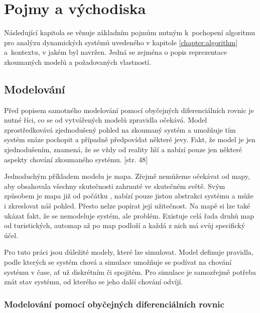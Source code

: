 \chapter{Pojmy a východiska}

Následující kapitola se věnuje základním pojmům nutným k~pochopení
algoritmu pro analýzu dynamických systémů uvedeného v kapitole \ref{chapter:algorithm}
a~kontextu, v jakém byl navržen. Jedná se zejména o popis reprezentace zkou\-ma\-ných
modelů a požadovaných vlastností.


\section{Modelování}

Před popisem samotného modelování pomocí obyčejných diferenciálních rovnic je
nutné říci, co se od vytvářených modelů zpravidla očekává. Model zpro\-středko\-vá\-vá
zjednodušený pohled na zkoumaný systém a umožňuje tím systém snáze pochopit a
případně předpovídat některé jevy. Fakt, že model je jen zjednodušením, znamená,
že se vždy od reality liší a nabízí pouze jen některé aspekty chování zkoumaného
systému. [str. 48]


Jednoduchým příkladem modelu je mapa. Zřejmě nemůžeme očekávat od mapy, aby obsahovala
všechny skutečnosti zahrnuté ve skutečném světě. Svým způsobem je mapa již od počátku
, nabízí pouze jistou abstrakci systému a může i zkreslovat náš pohled.
Přesto nelze popírat její užitečnost. Na mapě si lze také ukázat fakt, že se
nemodeluje systém, ale problém. Existuje celá řada druhů map od turistických, automap
až po map podloží a každá z nich má svůj specifický účel. \cite[str. 47 -- 58]{pelanek2012}

Pro tuto práci jsou důležité modely, které lze simulovat. Model definuje pravidla, podle
kterých se systém chová a simulace umožňuje se podívat na chování systému v čase, ať už
diskrétním či spojitém. Pro simulace je sa\-mozřej\-mě potřeba znát stav systému, od kterého
se jeho další chování odvíjí.

\subsection{Modelování pomocí obyčejných diferenciálních rovnic}

